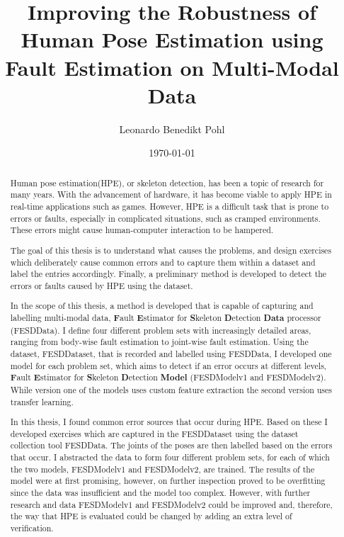 
\title{Improving the Robustness of Human Pose Estimation using Fault Estimation on Multi-Modal Data}
\author{Leonardo Benedikt Pohl}
\date{\today}
 
\newlength{\originalVOffset}
\newlength{\originalHOffset}
\setlength{\originalVOffset}{\voffset}   
\setlength{\originalHOffset}{\hoffset}

\setlength{\voffset}{0cm}
\setlength{\hoffset}{0cm}

\setlength{\voffset}{\originalVOffset}
\setlength{\hoffset}{\originalHOffset}

\cleardoublepage

\begin{abstract}  
  Human pose estimation(HPE), or skeleton detection, has been a topic of research for many years. With the advancement of hardware, it has become viable to apply HPE in real-time applications such as games. However, HPE is a difficult task that is prone to errors or faults, especially in complicated situations, such as cramped environments. These errors might cause human-computer interaction to be hampered.

  The goal of this thesis is to understand what causes the problems, and design exercises which deliberately cause common errors and to capture them within a dataset and label the entries accordingly. Finally, a preliminary method is developed to detect the errors or faults caused by HPE using the dataset.

  In the scope of this thesis, a method is developed that is capable of capturing and labelling multi-modal data, \textbf{F}ault \textbf{E}stimator for \textbf{S}keleton \textbf{D}etection \textbf{Data} processor (FESDData). I define four different problem sets with increasingly detailed areas, ranging from body-wise fault estimation to joint-wise fault estimation. Using the dataset, FESDDataset, that is recorded and labelled using FESDData, I developed one model for each problem set, which aims to detect if an error occurs at different levels, \textbf{F}ault \textbf{E}stimator for \textbf{S}keleton \textbf{D}etection \textbf{Model} (FESDModelv1 and FESDModelv2). While version one of the models uses custom feature extraction the second version uses transfer learning.

  In this thesis, I found common error sources that occur during HPE. Based on these I developed exercises which are captured in the FESDDataset using the dataset collection tool FESDData. The joints of the poses are then labelled based on the errors that occur. I abstracted the data to form four different problem sets, for each of which the two models, FESDModelv1 and FESDModelv2, are trained. The results of the model were at first promising, however, on further inspection proved to be overfitting since the data was insufficient and the model too complex. However, with further research and data FESDModelv1 and FESDModelv2 could be improved and, therefore, the way that HPE is evaluated could be changed by adding an extra level of verification.

\end{abstract}
